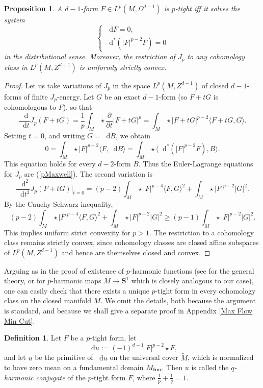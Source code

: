 \documentclass[reqno,11pt]{amsart}
\newcommand{\Sph}{\mathbf S}
\newcommand*\dif{\mathop{}\!\mathrm{d}}
\newcommand{\dfn}[1]{\emph{#1}\index{#1}}
\newtheorem{proposition}[theorem]{Proposition}
\theoremstyle{definition}
\newtheorem{definition}[theorem]{Definition}
\numberwithin{equation}{section}
\begin{document}
\begin{proposition}
A $d - 1$-form $F \in L^p(M, \Omega^{d - 1})$ is $p$-tight iff it solves the system
\begin{equation}\label{pMaxwell}
\begin{cases}
	\dif F = 0, \\
	\dif^*(|F|^{p - 2} F) = 0
\end{cases}
\end{equation}
in the distributional sense. Moreover, the restriction of $J_p$ to any cohomology class in $L^p(M, Z^{d - 1})$ is uniformly strictly convex.
\end{proposition}
\begin{proof}
Let us take variations of $J_p$ in the space $L^p(M, Z^{d - 1})$ of closed $d-1$-forms of finite $J_p$-energy.
Let $G$ be an exact $d - 1$-form (so $F + tG$ is cohomologous to $F$), so that
$$\frac{\dif}{\dif t} J_p(F + tG) = \frac{1}{p} \int_M \star \frac{\partial}{\partial t} |F + tG|^p = \int_M \star |F + tG|^{p - 2} \langle F + tG, G\rangle.$$
Setting $t = 0$, and writing $G = \dif B$, we obtain 
$$0 = \int_M \star |F|^{p - 2} \langle F, \dif B\rangle = \int_M \star \langle \dif^*(|F|^{p - 2} F), B\rangle.$$
This equation holds for every $d - 2$-form $B$.
Thus the Euler-Lagrange equations for $J_p$ are (\ref{pMaxwell}).
The second variation is 
$$\frac{\dif^2}{\dif t^2} J_p(F + tG)\bigg|_{t = 0} = (p - 2) \int_M \star |F|^{p - 4} \langle F, G\rangle^2 + \int_M \star |F|^{p - 2} |G|^2.$$
By the Cauchy-Schwarz inequality,
$$(p - 2) \int_M \star |F|^{p - 4} \langle F, G\rangle^2 + \int_M \star |F|^{p - 2} |G|^2 \geq (p - 1) \int_M \star |F|^{p - 2} |G|^2.$$
This implies uniform strict convexity for $p > 1$.
The restriction to a cohomology class remains strictly convex, since cohomology classes are closed affine subspaces of $L^p(M, Z^{d - 1})$ and hence are themselves closed and convex.
\end{proof}

Arguing as in the proof of existence of $p$-harmonic functions (see \cite[\S8.2]{evans2010partial} for the general theory, or \cite[\S2.1]{daskalopoulos2020transverse} for $p$-harmonic maps $M \to \Sph^1$ which is closely analogous to our case), one can easily check that there exists a unique $p$-tight form in every cohomology class on the closed manifold $M$.
We omit the details, both because the argument is standard, and because we shall give a separate proof in Appendix \ref{Max Flow Min Cut}.

\begin{definition}
Let $F$ be a $p$-tight form, let
\begin{equation}
\dif u := (-1)^{d - 1} |F|^{p - 2} \star F, \label{inverse extremality}
\end{equation}
and let $u$ be the primitive of $\dif u$ on the universal cover $\tilde M$, which is normalized to have zero mean on a fundamental domain $M_{\rm fun}$.
Then $u$ is called the \dfn{$q$-harmonic conjugate} of the $p$-tight form $F$, where $\frac{1}{p} + \frac{1}{q} = 1$.
\end{definition}
\end{document}
